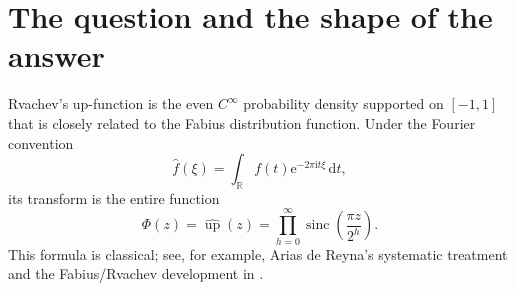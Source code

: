 \documentclass[11pt,oneside]{article}
\theoremstyle{definition}
\theoremstyle{remark}
\newcommand{\R}{\mathbb R}
\newcommand{\e}{\mathrm e}
\newcommand{\ii}{\mathrm i}
\newcommand{\dd}{\,\mathrm d}
\newcommand{\Up}{\operatorname{up}}
\newcommand{\sinc}{\operatorname{sinc}}
\newcommand{\Phiup}{\Phi}
\begin{document}
\begin{abstract}
For the literal Cesaro question, the arithmetic-mean gauge
$g(x)=A_1E_{\kappa_1}(x)$, where $A_1=0.091266124131588\ldots$, gives shell means tending to
one and solves the requested two-sided boundedness condition.  It also gives convergence at
dyadic endpoints.  At unrestricted endpoints a nonconstant dyadic-mantissa profile remains,
governed by a continuous singular eigenmeasure of an explicit transfer operator.  We prove
that no gauge with a stabilizing within-shell shape (including powers and iterated logarithms,
regularly varying factors, and fixed log-periodic corrections) can remove this profile.  A completely
unrestricted exotic scale-dependent analytic gauge is not ruled out by that theorem.  The
multiplicatively natural logarithmic Cesaro mean does converge for all endpoints, with
normalizing constant $A_1^{\log}=0.09386063575678\ldots$.

Finally, the raw annular maximum
$\mathfrak M_k=\max_{2^k\le x\le2^{k+1}}|\Phi(x)|$ has a sharper boundary-layer law:
\[
 \log\mathfrak M_k
 =-\frac{\log2}{2}k^2-(\log2)\kappa_\infty k
 -\frac{W(c(k+1))^2+2W(c(k+1))}{2\log2}
 +O((\log\log k)^2),
\]
where $c=(\log2)\pi^{-1}\sqrt{3/2}$ and $W$ is the principal Lambert function.  Thus the
largest point in a shell approaches its left boundary and carries a second log-normal factor
on the $\log\log x$ scale.  In contrast, the unique lobe maxima immediately after powers of
two form explicit deep valleys with leading coefficient $-1/\log2$, twice the generic
log-square coefficient.  Together these results reconcile every substantive disagreement
among the source documents and give the final rigorous decay dictionary.
\end{abstract}

\tableofcontents
\newpage

\section{The question and the shape of the answer}
\label{sec:introduction}

Rvachev's up-function is the even $C^\infty$ probability density supported on $[-1,1]$
that is closely related to the Fabius distribution function.  Under the Fourier convention
\[
 \widehat f(\xi)=\int_{\R}f(t)\e^{-2\pi\ii t\xi}\dd t,
\]
its transform is the entire function
\begin{equation}
 \Phiup(z)=\widehat{\Up}(z)
 =\prod_{h=0}^{\infty}\sinc\!\left(\frac{\pi z}{2^h}\right).
 \label{eq:Phi-definition}
\end{equation}
This formula is classical; see, for example, Arias de Reyna's systematic treatment
\cite{arias1982} and the Fabius/Rvachev development in \cite{proveit}.
\end{document}
